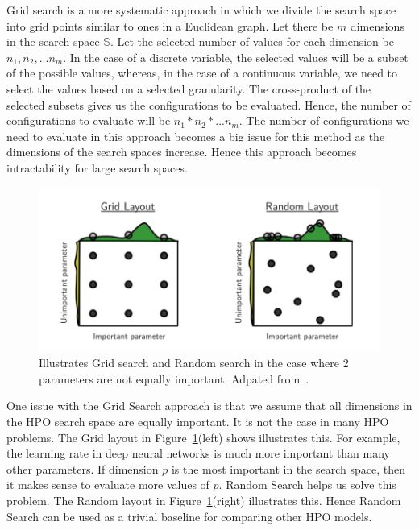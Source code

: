 \documentclass[11pt]{report}
\begin{document}
Grid search is a more systematic approach in which we divide the search space into grid points similar to ones in a Euclidean graph.
Let there be $m$ dimensions in the search space $\mathbb{S}$. Let the selected number of values for each dimension be $n_1, n_2, ... n_m$. In the case of a discrete variable, the selected values will be a subset of the possible values, whereas, in the case of a continuous variable, we need to select the values based on a selected granularity.
The cross-product of the selected subsets gives us the configurations to be evaluated. Hence, the number of configurations to evaluate will be $n_1 * n_2 * ... n_m$.
The number of configurations we need to evaluate in this approach becomes a big issue for this method as the dimensions of the search spaces increase.
Hence this approach becomes intractability for large search spaces.

\begin{figure}[htb]
  \centering
    \includegraphics[scale=0.8]{images/rsgsexample}
    \caption{Illustrates Grid search and Random search in the case where 2 parameters are not equally important.  Adpated from~\cite{rshpoarticle}.}
    \label{fig:rshpofig}
\end{figure}

One issue with the Grid Search approach is that we assume that all dimensions in the HPO search space are equally important. It is not the case in many HPO problems.  The Grid layout in Figure~\ref{fig:rshpofig}(left) shows illustrates this.  For example, the learning rate in deep neural networks is much more important than many other parameters. If dimension $p$ is the most important in the search space, then it makes sense to evaluate more values of $p$. Random Search helps us solve this problem. 
The Random layout in Figure~\ref{fig:rshpofig}(right) illustrates this. 
Hence Random Search can be used as a trivial baseline for comparing other HPO models.
\end{document}
